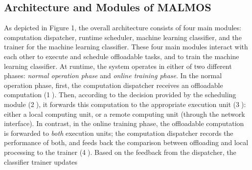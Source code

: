\documentclass[10pt, conference, compsocconf]{IEEEtran}
\begin{document}
\subsection{Architecture and Modules of MALMOS}
%
As depicted in Figure 1, the overall architecture consists
of four main modules: computation dispatcher, runtime scheduler, machine
learning classifier, and the trainer for the machine learning classifier.
%
These four main modules interact with each other to execute and
schedule offloadable tasks, and to train the machine learning
classifier. 
%
At runtime, the system operates in either of two different phases:
\textit{normal operation phase} and \textit{online training phase}.
%
In the normal operation phase, first, the computation dispatcher
receives an offloadable computation (\textcircled{1}).
%
Then, according to the decision provided by the scheduling module
(\textcircled{2}), it forwards this computation to the appropriate
execution unit (\textcircled{3}): either a local computing unit, or a
remote computing unit (through the network interface).
%
In contrast, in the online training phase, the offloadable
computation is forwarded to \textit{both} execution units; the
computation dispatcher records the performance of both, and feeds back
the comparison between offloading and local processing to the trainer
(\textcircled{4}).
%
Based on the feedback from the dispatcher, the classifier trainer updates
\end{document}
